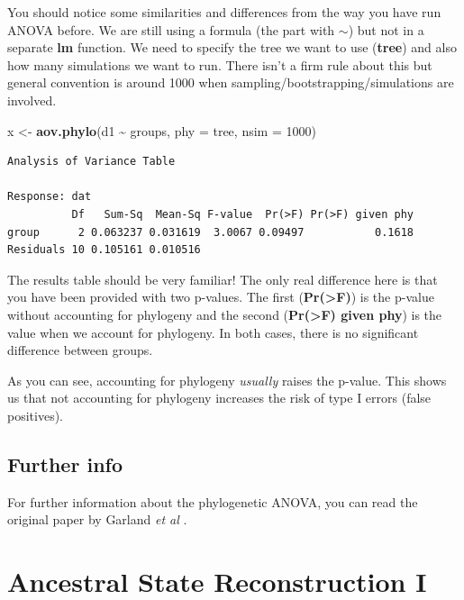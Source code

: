 \documentclass[
]{book}
\newenvironment{Shaded}{\begin{snugshade}}{\end{snugshade}}
\newcommand{\DataTypeTok}[1]{\textcolor[rgb]{0.13,0.29,0.53}{#1}}
\newcommand{\DecValTok}[1]{\textcolor[rgb]{0.00,0.00,0.81}{#1}}
\newcommand{\KeywordTok}[1]{\textcolor[rgb]{0.13,0.29,0.53}{\textbf{#1}}}
\newcommand{\NormalTok}[1]{#1}
\newcommand{\OperatorTok}[1]{\textcolor[rgb]{0.81,0.36,0.00}{\textbf{#1}}}
\newcommand{\StringTok}[1]{\textcolor[rgb]{0.31,0.60,0.02}{#1}}
\begin{document}
You should notice some similarities and differences from the way you have run ANOVA before. We are still using a formula (the part with \(\sim\)) but not in a separate \textbf{lm} function. We need to specify the tree we want to use (\textbf{tree}) and also how many simulations we want to run. There isn't a firm rule about this but general convention is around 1000 when sampling/bootstrapping/simulations are involved.

\begin{Shaded}
\begin{Highlighting}[]
\NormalTok{x \textless{}{-}}\StringTok{ }\KeywordTok{aov.phylo}\NormalTok{(d1 }\OperatorTok{\textasciitilde{}}\StringTok{ }\NormalTok{groups, }\DataTypeTok{phy =}\NormalTok{ tree, }\DataTypeTok{nsim =} \DecValTok{1000}\NormalTok{)}
\end{Highlighting}
\end{Shaded}

\begin{verbatim}
Analysis of Variance Table

Response: dat
          Df   Sum-Sq  Mean-Sq F-value  Pr(>F) Pr(>F) given phy
group      2 0.063237 0.031619  3.0067 0.09497           0.1618
Residuals 10 0.105161 0.010516                                 
\end{verbatim}

The results table should be very familiar! The only real difference here is that you have been provided with two p-values. The first (\textbf{Pr(\textgreater F)}) is the p-value without accounting for phylogeny and the second (\textbf{Pr(\textgreater F) given phy}) is the value when we account for phylogeny. In both cases, there is no significant difference between groups.

As you can see, accounting for phylogeny \emph{usually} raises the p-value. This shows us that not accounting for phylogeny increases the risk of type I errors (false positives).

\hypertarget{further-info-2}{%
\section{Further info}\label{further-info-2}}

For further information about the phylogenetic ANOVA, you can read the original paper by Garland \emph{et al} \citeyearpar{garland93}.

\hypertarget{asr1}{%
\chapter{Ancestral State Reconstruction I}\label{asr1}}
\end{document}
